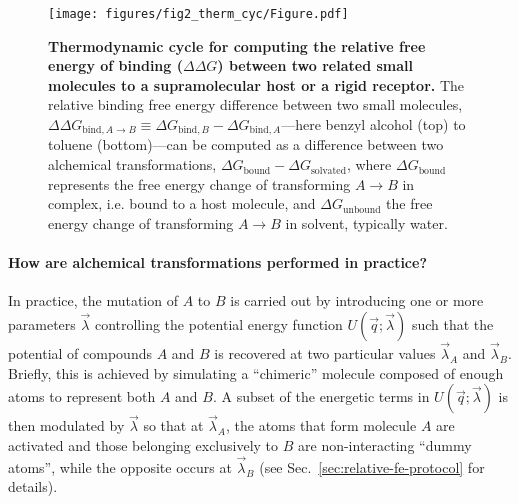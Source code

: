 \documentclass[9pt,bestpractices]{livecoms}
\begin{document}
\begin{figure}
    \texttt{[image: figures/fig2\_therm\_cyc/Figure.pdf]}
    \caption{{\bf Thermodynamic cycle for computing the relative free energy of binding ($\Delta \Delta G$) between two related small molecules to a supramolecular host or a rigid receptor.}
    The relative binding free energy difference between two small molecules, $\Delta \Delta G_{\mathrm{bind}, A \rightarrow B} \equiv \Delta G_{\mathrm{bind}, B} - \Delta G_{\mathrm{bind}, A}$---here benzyl alcohol (top) to toluene (bottom)---can be computed as a difference between two alchemical transformations, $\Delta G_\mathrm{bound} - \Delta G_\mathrm{solvated}$, where $\Delta G_\mathrm{bound}$ represents the free energy change of transforming $A \rightarrow B$ in complex, i.e. bound to a host molecule, and $\Delta G_\mathrm{unbound}$ the free energy change of transforming $A \rightarrow B$ in solvent, typically water.}
    \label{fig:fig_binding_thermodynamic_cycle}
\end{figure}

\paragraph{How are alchemical transformations performed in practice?}

In practice, the mutation of $A$ to $B$ is carried out by introducing one or more parameters $\vec{\lambda}$ controlling the potential energy function $U(\vec{q};\vec{\lambda})$ such that the potential of compounds $A$ and $B$ is recovered at two particular values $\vec{\lambda}_A$ and $\vec{\lambda}_B$.
Briefly, this is achieved by simulating a ``chimeric'' molecule composed of enough atoms to represent both $A$ and $B$.
A subset of the energetic terms in $U(\vec{q};\vec{\lambda})$ is then modulated by $\vec{\lambda}$ so that at $\vec{\lambda}_A$, the atoms that form molecule $A$ are activated and those belonging exclusively to $B$ are non-interacting ``dummy atoms'', while the opposite occurs at $\vec{\lambda}_B$ (see Sec.~\ref{sec:relative-fe-protocol} for details).
\end{document}
